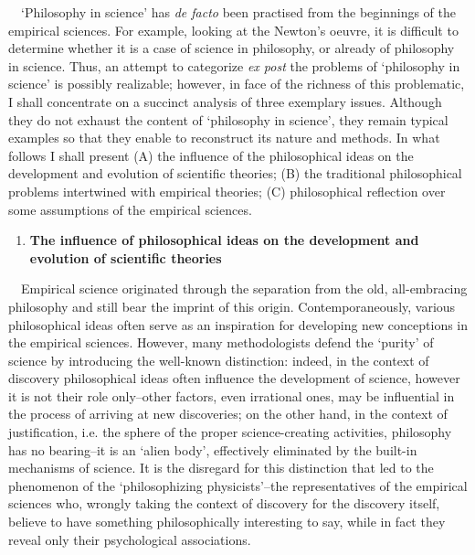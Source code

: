 \documentclass[a4paper]{article}
\begin{document}
\ \ ‘Philosophy in science’ has \textit{de facto} been practised from the beginnings of the empirical sciences. For
example, looking at the Newton’s oeuvre, it is difficult to determine whether it is a case of science in philosophy, or
already of philosophy in science. Thus, an attempt to categorize \textit{ex post }the problems of ‘philosophy in
science’ is possibly realizable; however, in face of the richness of this problematic, I shall concentrate on a
succinct analysis of three exemplary issues. Although they do not exhaust the content of ‘philosophy in science’, they
remain typical examples so that they enable to reconstruct its nature and methods. In what follows I shall present (A)
the influence of the philosophical ideas on the development and evolution of scientific theories; (B) the traditional
philosophical problems intertwined with empirical theories; (C) philosophical reflection over some assumptions of the
empirical sciences.

\begin{enumerate}
\item {\bfseries
The influence of philosophical ideas on the development and evolution of scientific theories}
\end{enumerate}
\ \ Empirical science originated through the separation from the old, all-embracing philosophy and still bear the
imprint of this origin. Contemporaneously, various philosophical ideas often serve as an inspiration for developing new
conceptions in the empirical sciences. However, many methodologists defend the ‘purity’ of science by introducing the
well-known distinction: indeed, in the context of discovery philosophical ideas often influence the development of
science, however it is not their role only–other factors, even irrational ones, may be influential in the process of
arriving at new discoveries; on the other hand, in the context of justification, i.e. the sphere of the proper
science-creating activities, philosophy has no bearing–it is an ‘alien body’, effectively eliminated by the built-in
mechanisms of science. It is the disregard for this distinction that led to the phenomenon of the ‘philosophizing
physicists’–the representatives of the empirical sciences who, wrongly taking the context of discovery for the
discovery itself, believe to have something philosophically interesting to say, while in fact they reveal only their
psychological associations.
\end{document}
